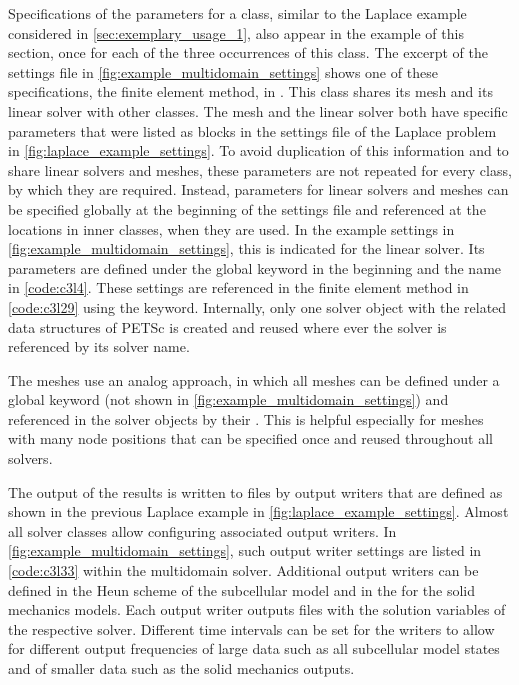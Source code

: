Specifications of the parameters for a  class, similar to the Laplace example considered in \cref{sec:exemplary_usage_1}, also appear in the example of this section, once for each of the three occurrences of this class. The excerpt of the settings file in \cref{fig:example_multidomain_settings} shows one of these specifications, the  finite element method, in . 
This  class shares its mesh and its linear solver with other classes. The mesh and the linear solver both have specific parameters that were listed as blocks in the settings file of the Laplace problem in \cref{fig:laplace_example_settings}. To avoid duplication of this information and to share linear solvers and meshes, these parameters are not repeated for every class, by which they are required. Instead, parameters for linear solvers and meshes can be specified globally at the beginning of the settings file and referenced at the locations in inner classes, when they are used. In the example settings in \cref{fig:example_multidomain_settings}, this is indicated for the linear solver. Its parameters are defined under the global  keyword  in the beginning and the name  in \cref{code:c3l4}. These settings are referenced in the finite element method in \cref{code:c3l29} using the  keyword. Internally, only one solver object with the related data structures of PETSc is created and reused where ever the solver is referenced by its solver name.

The meshes use an analog approach, in which all meshes can be defined under a global  keyword (not shown in \cref{fig:example_multidomain_settings}) and referenced in the solver objects by their . This is helpful especially for meshes with many node positions that can be specified once and reused throughout all solvers.

The output of the results is written to files by output writers that are defined as shown in the previous Laplace example in \cref{fig:laplace_example_settings}. Almost all solver classes allow configuring associated output writers. In \cref{fig:example_multidomain_settings}, such output writer settings are listed in \cref{code:c3l33} within the multidomain solver. Additional output writers can be defined in the Heun scheme of the subcellular model and in the  for the solid mechanics models. Each output writer outputs files with the solution variables of the respective solver. Different time intervals can be set for the writers to allow for different output frequencies of large data such as all subcellular model states and of smaller data such as the solid mechanics outputs.

